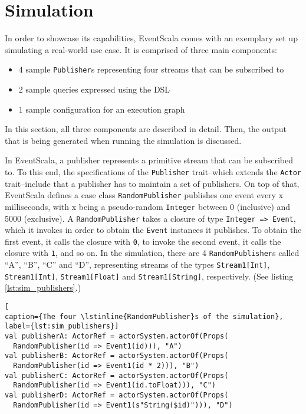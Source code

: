 \documentclass[article, type=bsc, colorback, accentcolor=tud8b, parskip=half, bibliography=totocnumbered]{tudthesis}
\begin{document}
\newpage

\section{Simulation}
\label{sec:simulation}

In order to showcase its capabilities, EventScala comes with an exemplary set up simulating a real-world use case.
It is comprised of three main components:

\begin{itemize}

\item
4 sample \lstinline{Publisher}s representing four streams that can be subscribed to

\item
2 sample queries expressed using the DSL

\item
1 sample configuration for an execution graph

\end{itemize}

In this section, all three components are described in detail.
Then, the output that is being generated when running the simulation is discussed.

In EventScala, a publisher represents a primitive stream that can be subscribed to.
To this end, the specifications of the \lstinline{Publisher} trait--which extends the \lstinline{Actor} trait--include that a publisher has to maintain a set of publishers.
On top of that, EventScala defines a case class \lstinline{RandomPublisher} publishes one event every x milliseconds, with x being a pseudo-random \lstinline{Integer} between 0 (inclusive) and 5000 (exclusive).
A \lstinline{RandomPublisher} takes a closure of type \lstinline{Integer => Event}, which it invokes in order to obtain the \lstinline{Event} instances it publishes.
To obtain the first event, it calls the closure with \lstinline{0}, to invoke the second event, it calls the closure with \lstinline{1}, and so on.
In the simulation, there are 4 \lstinline{RandomPublisher}s called ``A'', ``B'', ``C'' and ``D'', representing streams of the types \lstinline{Stream1[Int]}, \lstinline{Stream1[Int]}, \lstinline{Stream1[Float]} and \lstinline{Stream1[String]}, respectively.
(See listing \ref{lst:sim_publishers}.)

\begin{lstlisting}[
caption={The four \lstinline{RandomPublisher}s of the simulation},
label={lst:sim_publishers}]
val publisherA: ActorRef = actorSystem.actorOf(Props(
  RandomPublisher(id => Event1(id))), "A")
val publisherB: ActorRef = actorSystem.actorOf(Props(
  RandomPublisher(id => Event1(id * 2))), "B")
val publisherC: ActorRef = actorSystem.actorOf(Props(
  RandomPublisher(id => Event1(id.toFloat))), "C")
val publisherD: ActorRef = actorSystem.actorOf(Props(
  RandomPublisher(id => Event1(s"String($id)"))), "D")
\end{lstlisting}
\end{document}
